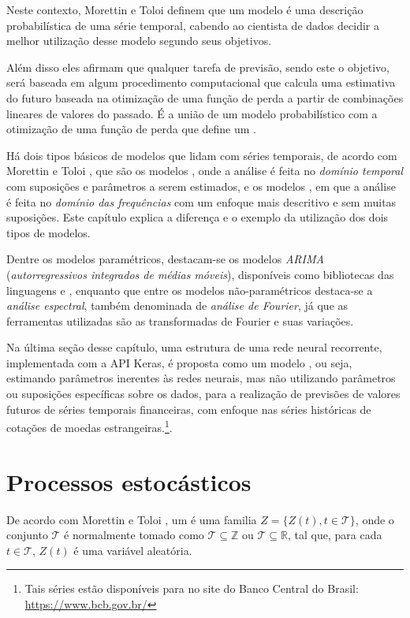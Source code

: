 Neste contexto, Morettin e Toloi \citep{morettin} definem que um modelo é uma descrição probabilística de uma série temporal, cabendo ao cientista de dados decidir a melhor utilização desse modelo segundo seus objetivos. 

Além disso eles afirmam que qualquer tarefa de previsão, sendo este o objetivo, será baseada em algum procedimento computacional que calcula uma estimativa do futuro baseada na otimização de uma função de perda a partir de combinações lineares de valores do passado. É a união de um modelo probabilístico com a otimização de uma função de perda que define um .

Há dois tipos básicos de modelos que lidam com séries temporais, de acordo com Morettin e Toloi \citep{morettin}, que são os modelos , onde a análise é feita no \emph{domínio temporal} com suposições e parâmetros a serem estimados, e os modelos , em que a análise é feita no \emph{domínio das frequências} com um enfoque mais descritivo e sem muitas suposições. Este capítulo explica a diferença e o exemplo da utilização dos dois tipos de modelos.

Dentre os modelos paramétricos, destacam-se os modelos \emph{ARIMA} (\emph{autorregressivos integrados de médias móveis}), disponíveis como bibliotecas das linguagens  e , enquanto que entre os modelos não-paramétricos destaca-se a \emph{análise espectral}, também denominada de \emph{análise de Fourier}, já que as ferramentas utilizadas são as transformadas de Fourier e suas variações.

Na última seção desse capítulo, uma estrutura de uma rede neural recorrente, implementada com a API Keras, é proposta como um modelo , ou seja, estimando parâmetros inerentes às redes neurais, mas não utilizando parâmetros ou suposições específicas sobre os dados, para a realização de previsões de valores futuros de séries temporais financeiras, com enfoque nas séries históricas de cotações de moedas estrangeiras.\footnote{Tais séries estão disponíveis para  no site do Banco Central do Brasil: \url{https://www.bcb.gov.br/}}.

\section{Processos estocásticos}

De acordo com Morettin e Toloi \citep{morettin}, um  é uma familia $Z = \{ Z(t), t \in \mathcal{T} \}$, onde o conjunto $\mathcal{T}$ é normalmente tomado como $\mathcal{T} \subseteq \mathbb{Z}$ ou $\mathcal{T} \subseteq \mathbb{R}$, tal que, para cada $t \in \mathcal{T}$, $Z(t)$ é uma variável aleatória. 

